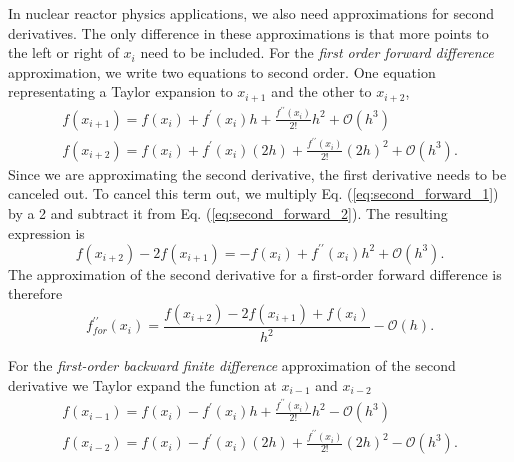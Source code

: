 In nuclear reactor physics applications, we also need approximations for second derivatives.  The only difference in 
these approximations is that more points to the left or right of $x_{i}$ need to be included. For the \emph{first order
forward difference} approximation, we write two equations to second order. One equation representating a Taylor expansion
to $x_{i+1}$ and the other to $x_{i+2}$,
\begin{eqnarray}
    f\left(x_{i+1}\right) = f\left(x_{i}\right) + f^{\prime}\left(x_{i}\right)h + \frac{f^{\prime\prime}\left(x_{i}\right)}{2!}h^{2} + \mathcal{O}\left(h^{3}\right) 
  \label{eq:second_forward_1}
\\
    f\left(x_{i+2}\right) = f\left(x_{i}\right) + f^{\prime}\left(x_{i}\right)\left(2h\right) + \frac{f^{\prime\prime}\left(x_{i}\right)}{2!}\left(2h\right)^{2} + \mathcal{O}\left(h^{3}\right).
  \label{eq:second_forward_2}
\end{eqnarray}
Since we are approximating the second derivative, the first derivative needs to be canceled out. To cancel this term out, 
we multiply Eq. (\ref{eq:second_forward_1}) by a 2 and subtract it from Eq. (\ref{eq:second_forward_2}). The resulting 
expression is
\begin{equation}
    f\left(x_{i+2}\right) - 2f\left(x_{i+1}\right) = -f\left(x_{i}\right) + f^{\prime\prime}\left(x_{i}\right)h^{2} + \mathcal{O}\left(h^{3}\right).
\end{equation}
The approximation of the second derivative for a first-order forward difference is therefore
\begin{equation}
    \boxed{f^{\prime\prime}_{for}\left(x_{i}\right) = \frac{f\left(x_{i+2}\right) - 2f\left(x_{i+1}\right) + f\left(x_{i}\right)}{h^{2}} - \mathcal{O}\left(h\right).}
    \label{eq:second_forward}
\end{equation}
\par 
For the \emph{first-order backward finite difference} approximation of the second derivative we Taylor expand the function at
$x_{i-1}$ and $x_{i-2}$ 
\begin{eqnarray}
    f\left(x_{i-1}\right) = f\left(x_{i}\right) - f^{\prime}\left(x_{i}\right)h + \frac{f^{\prime\prime}\left(x_{i}\right)}{2!}h^{2} - \mathcal{O}\left(h^{3}\right) 
  \label{eq:second_backward_1}
\\
    f\left(x_{i-2}\right) = f\left(x_{i}\right) - f^{\prime}\left(x_{i}\right)\left(2h\right) + \frac{f^{\prime\prime}\left(x_{i}\right)}{2!}\left(2h\right)^{2} - \mathcal{O}\left(h^{3}\right).
  \label{eq:second_backward_2}
\end{eqnarray}
